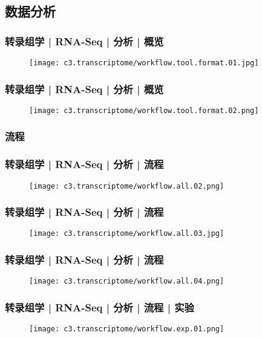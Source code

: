 \subsection{数据分析}
\begin{frame}
  \frametitle{转录组学 | RNA-Seq | 分析 | 概览}
  \begin{figure}
    \centering
    \texttt{[image: c3.transcriptome/workflow.tool.format.01.jpg]}
  \end{figure}
\end{frame}

\begin{frame}
  \frametitle{转录组学 | RNA-Seq | 分析 | 概览}
  \begin{figure}
    \centering
    \texttt{[image: c3.transcriptome/workflow.tool.format.02.png]}
  \end{figure}
\end{frame}

\subsubsection{流程}
\begin{frame}
  \frametitle{转录组学 | RNA-Seq | 分析 | 流程}
  \begin{figure}
    \centering
    \texttt{[image: c3.transcriptome/workflow.all.02.png]}
  \end{figure}
\end{frame}

\begin{frame}
  \frametitle{转录组学 | RNA-Seq | 分析 | 流程}
  \begin{figure}
    \centering
    \texttt{[image: c3.transcriptome/workflow.all.03.jpg]}
  \end{figure}
\end{frame}

\begin{frame}
  \frametitle{转录组学 | RNA-Seq | 分析 | 流程}
  \begin{figure}
    \centering
    \texttt{[image: c3.transcriptome/workflow.all.04.png]}
  \end{figure}
\end{frame}

\begin{frame}
  \frametitle{转录组学 | RNA-Seq | 分析 | 流程 | 实验}
  \begin{figure}
    \centering
    \texttt{[image: c3.transcriptome/workflow.exp.01.png]}
  \end{figure}
\end{frame}

